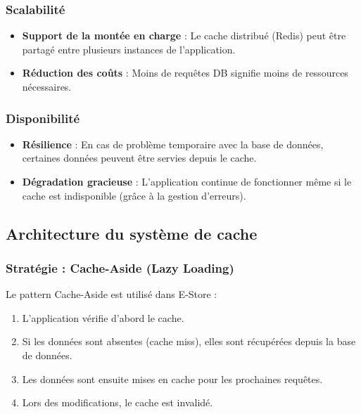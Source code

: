 \documentclass[12pt,a4paper]{article}
\begin{document}
\subsubsection{Scalabilité}

\begin{itemize}
    \item \textbf{Support de la montée en charge} : Le cache distribué (Redis) peut être partagé entre plusieurs instances de l'application.
    \item \textbf{Réduction des coûts} : Moins de requêtes DB signifie moins de ressources nécessaires.
\end{itemize}

\subsubsection{Disponibilité}

\begin{itemize}
    \item \textbf{Résilience} : En cas de problème temporaire avec la base de données, certaines données peuvent être servies depuis le cache.
    \item \textbf{Dégradation gracieuse} : L'application continue de fonctionner même si le cache est indisponible (grâce à la gestion d'erreurs).
\end{itemize}

\subsection{Architecture du système de cache}

\subsubsection{Stratégie : Cache-Aside (Lazy Loading)}

Le pattern Cache-Aside est utilisé dans E-Store :

\begin{enumerate}
    \item L'application vérifie d'abord le cache.
    \item Si les données sont absentes (cache miss), elles sont récupérées depuis la base de données.
    \item Les données sont ensuite mises en cache pour les prochaines requêtes.
    \item Lors des modifications, le cache est invalidé.
\end{enumerate}
\end{document}
